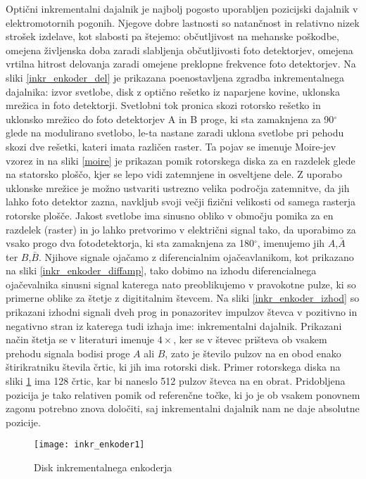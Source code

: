 \documentclass[a4paper,twoside,openright,12pt]{book}
\begin{document}
Optični inkrementalni dajalnik je najbolj pogosto uporabljen pozicijski dajalnik v elektromotornih pogonih. Njegove dobre lastnosti so natančnost in relativno nizek strošek izdelave, kot slabosti pa štejemo: občutljivost na mehanske poškodbe, omejena življenska doba zaradi slabljenja občutljivosti foto detektorjev, omejena vrtilna hitrost delovanja zaradi omejene preklopne frekvence foto detektorjev. Na sliki \ref{inkr_enkoder_del} je prikazana poenostavljena zgradba inkrementalnega dajalnika: izvor svetlobe, disk z optično rešetko iz naparjene kovine, uklonska mrežica in foto detektorji. Svetlobni tok pronica skozi rotorsko rešetko in uklonsko mrežico do foto detektorjev A in B proge, ki sta zamaknjena za 90$^\circ$  glede na modulirano svetlobo, le-ta nastane zaradi uklona svetlobe pri pehodu skozi dve rešetki, kateri imata različen raster. Ta pojav se imenuje Moire-jev vzorez in na sliki \ref{moire} \cite{gabrielyan2007basics} je prikazan pomik rotorskega diska za en razdelek glede na statorsko ploščo, kjer se lepo vidi zatemnjene in osveltjene dele. Z uporabo uklonske mrežice je možno ustvariti ustrezno velika področja zatemnitve, da jih lahko foto detektor zazna, navkljub svoji večji fizični velikosti od samega rasterja rotorske plošče. Jakost svetlobe ima sinusno obliko v območju pomika za en razdelek (raster) in jo lahko pretvorimo v električni signal tako, da uporabimo za vsako progo dva fotodetektorja, ki sta zamaknjena za 180$^\circ$, imenujemo jih $A$,$\bar{A}$ ter $B$,$\bar{B}$. Njihove signale ojačamo z diferencialnim ojačeavlanikom, kot prikazano na sliki \ref{inkr_enkoder_diffamp}, tako dobimo na izhodu diferencialnega ojačevalnika sinusni signal katerega nato preoblikujemo v pravokotne pulze, ki so primerne oblike za štetje z digititalnim števcem. Na sliki \ref{inkr_enkoder_izhod} so prikazani izhodni signali dveh prog in ponazoritev impulzov števca v pozitivno in negativno stran iz katerega tudi izhaja ime: inkrementalni dajalnik. Prikazani način štetja se v literaturi imenuje $4\times$, ker se v števec prišteva ob vsakem prehodu signala bodisi proge $A$ ali $B$, zato je število pulzov na en obod enako štirikratniku števila črtic, ki jih ima rotorski disk. Primer rotorskega diska na sliki \ref{inkr_enkoder1} ima 128 črtic, kar bi naneslo 512 pulzov števca na en obrat. Pridobljena pozicija je tako relativen pomik od referenčne točke, ki jo je ob vsakem ponovnem zagonu potrebno znova določiti, saj inkrementalni dajalnik nam ne daje absolutne pozicije. 
\begin{figure}[h]
	\centering
	\texttt{[image: inkr\_enkoder1]}
	\caption{\label{inkr_enkoder1} Disk inkrementalnega enkoderja}
\end{figure}
\end{document}
